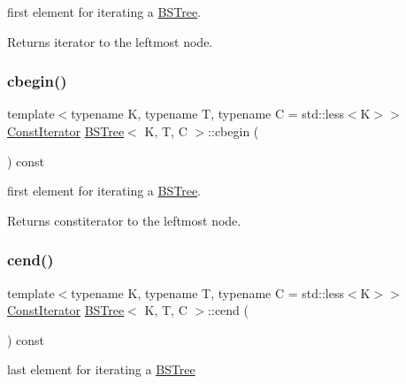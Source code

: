 first element for iterating a \hyperlink{class_b_s_tree}{B\+S\+Tree}. 

\begin{DoxyReturn}{Returns}
iterator to the leftmost node. 
\end{DoxyReturn}
\mbox{\label{class_b_s_tree_a575273bc2b272f20f8b6802f2b0a756f}} 
\subsubsection{\texorpdfstring{cbegin()}{cbegin()}}
{\footnotesize\ttfamily template$<$typename K, typename T, typename C = std\+::less$<$\+K$>$$>$ \\
\hyperlink{class_b_s_tree_1_1_const_iterator}{Const\+Iterator} \hyperlink{class_b_s_tree}{B\+S\+Tree}$<$ K, T, C $>$\+::cbegin (\begin{DoxyParamCaption}{ }\end{DoxyParamCaption}) const\hspace{0.3cm}{\ttfamily [inline]}}



first element for iterating a \hyperlink{class_b_s_tree}{B\+S\+Tree}. 

\begin{DoxyReturn}{Returns}
constiterator to the leftmost node. 
\end{DoxyReturn}
\mbox{\label{class_b_s_tree_a562638580a40643c76913e51dd06c13b}} 
\subsubsection{\texorpdfstring{cend()}{cend()}}
{\footnotesize\ttfamily template$<$typename K, typename T, typename C = std\+::less$<$\+K$>$$>$ \\
\hyperlink{class_b_s_tree_1_1_const_iterator}{Const\+Iterator} \hyperlink{class_b_s_tree}{B\+S\+Tree}$<$ K, T, C $>$\+::cend (\begin{DoxyParamCaption}{ }\end{DoxyParamCaption}) const\hspace{0.3cm}{\ttfamily [inline]}}



last element for iterating a \hyperlink{class_b_s_tree}{B\+S\+Tree} 

